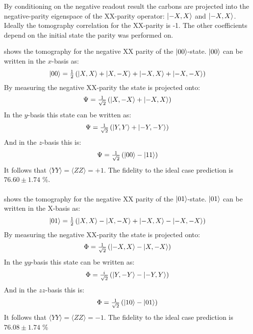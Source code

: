 By conditioning on the negative readout result the carbons are projected into the negative-parity eigenspace of the XX-parity operator: ${\left\vert{-X,X}\right\rangle}$ and ${\left\vert{-X,X}\right\rangle}$.
Ideally the tomography correlation for the XX-parity is -1.
The other coefficients depend on the initial state the parity was performed on.

 shows the tomography for the negative XX parity of the ${\left\vert{00}\right\rangle}$-state.
${\left\vert{00}\right\rangle}$ can be written in the $x$-basis as:
\begin{equation}
      {\left\vert{00}\right\rangle} = \tfrac{1}{2} \left( {\left\vert{X,X}\right\rangle} + {\left\vert{X,-X}\right\rangle} +{\left\vert{-X,X}\right\rangle} + {\left\vert{-X,-X}\right\rangle} \right)
 \end{equation}
By measuring the negative XX-parity the state is projected onto:
\begin{equation}
    \Psi = \tfrac{1}{\sqrt{2}} \left( {\left\vert{X,-X}\right\rangle} +{\left\vert{-X,X}\right\rangle} \right)
\end{equation}
In the $y$-basis this state can be written as:
\begin{equation}
    \Psi = \tfrac{1}{\sqrt{2}} \left( {\left\vert{Y,Y}\right\rangle} +{\left\vert{-Y,-Y}\right\rangle} \right)
\end{equation}
And in the $z$-basis this is:
\begin{equation}
    \Psi = \tfrac{1}{\sqrt{2}} \left( {\left\vert{00}\right\rangle} -{\left\vert{11}\right\rangle} \right)
\end{equation}
It follows that $\langle YY \rangle = \langle ZZ \rangle = +1$.
The fidelity to the ideal case prediction is $76.60 \pm 1.74$ \%.

\paragraph{ }
 shows the tomography for the negative XX parity of the ${\left\vert{01}\right\rangle}$-state.
${\left\vert{01}\right\rangle}$ can be written in the X-basis as:
\begin{equation}
    {\left\vert{01}\right\rangle} = \tfrac{1}{2} \left( {\left\vert{X,X}\right\rangle} - {\left\vert{X,-X}\right\rangle} +{\left\vert{-X,X}\right\rangle} - {\left\vert{-X,-X}\right\rangle} \right)
 \end{equation}
By measuring the negative XX-parity the state is projected onto:
\begin{equation}
    \Phi = \tfrac{1}{\sqrt{2}} \left( {\left\vert{-X,X}\right\rangle} -{\left\vert{X,-X}\right\rangle} \right)
\end{equation}
In the $yy$-basis this state can be written as:
\begin{equation}
    \Phi = \tfrac{i}{\sqrt{2}} \left( {\left\vert{Y,-Y}\right\rangle} -{\left\vert{-Y,Y}\right\rangle} \right)
\end{equation}
And in the $zz$-basis this is:
\begin{equation}
    \Phi = \tfrac{1}{\sqrt{2}} \left( {\left\vert{10}\right\rangle} -{\left\vert{01}\right\rangle} \right)
\end{equation}
It follows that $\langle YY \rangle = \langle ZZ \rangle = -1$.
The fidelity to the ideal case prediction is  $76.08 \pm 1.74$ \%


